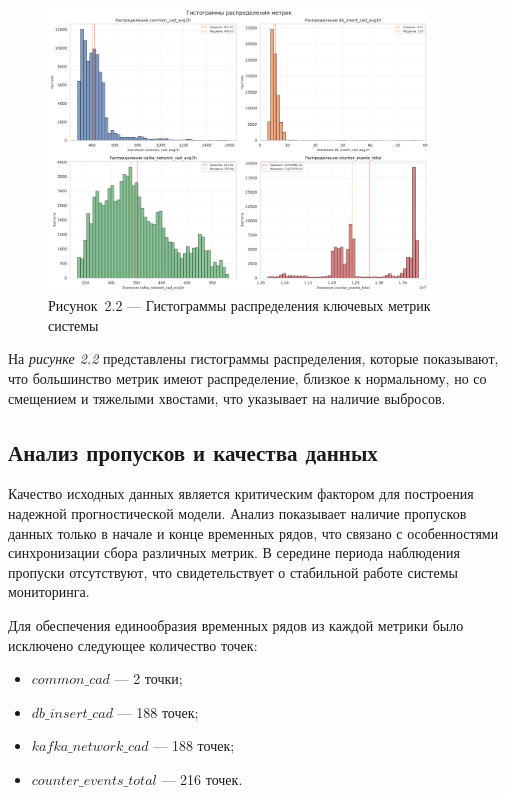 \begin{figure}[H]
	\centering
	\includegraphics[width=0.9\textwidth]{figures/chapter2/metrics_distribution.png}
	\caption*{Рисунок~2.2 --- Гистограммы распределения ключевых метрик системы}
	\label{fig:metrics_distribution}
\end{figure}

\hspace*{1.25cm}На \textit{рисунке 2.2} представлены гистограммы распределения, которые показывают, что большинство метрик имеют распределение, близкое к нормальному, но со смещением и тяжелыми хвостами, что указывает на наличие выбросов.

\subsection{Анализ пропусков и качества данных}

\hspace*{1.25cm}Качество исходных данных является критическим фактором для построения надежной прогностической модели. Анализ показывает наличие пропусков данных только в начале и конце временных рядов, что связано с особенностями синхронизации сбора различных метрик. В середине периода наблюдения пропуски отсутствуют, что свидетельствует о стабильной работе системы мониторинга.

\hspace*{1.25cm}Для обеспечения единообразия временных рядов из каждой метрики было исключено следующее количество точек:

\begin{itemize}
	\item $common\_cad$ --- 2 точки;
	\item $db\_insert\_cad$ --- 188 точек;
	\item $kafka\_network\_cad$ --- 188 точек;
	\item $counter\_events\_total$ --- 216 точек.
\end{itemize}

